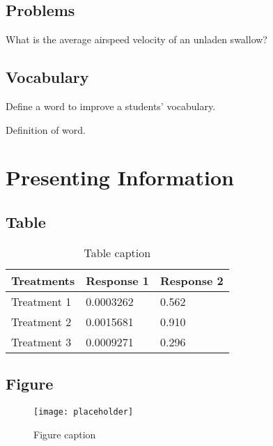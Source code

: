 	
	\section{Problems}
	
	\begin{problem}
		What is the average airspeed velocity of an unladen swallow?
	\end{problem}
	
	
	\section{Vocabulary}
	
	Define a word to improve a students' vocabulary.
	
	\begin{vocabulary}[Word]
		Definition of word.
	\end{vocabulary}
	
	
	
	
	\chapter{Presenting Information}
	
	\section{Table}
	
	\begin{table}[h]
		\centering
		\begin{tabular}{l l l}
			\toprule
			\textbf{Treatments} & \textbf{Response 1} & \textbf{Response 2}\\
			\midrule
			Treatment 1 & 0.0003262 & 0.562 \\
			Treatment 2 & 0.0015681 & 0.910 \\
			Treatment 3 & 0.0009271 & 0.296 \\
			\bottomrule
		\end{tabular}
		\caption{Table caption}
	\end{table}
	
	
	\section{Figure}
	
	\begin{figure}[h]
		\centering\texttt{[image: placeholder]}
		\caption{Figure caption}
	\end{figure}